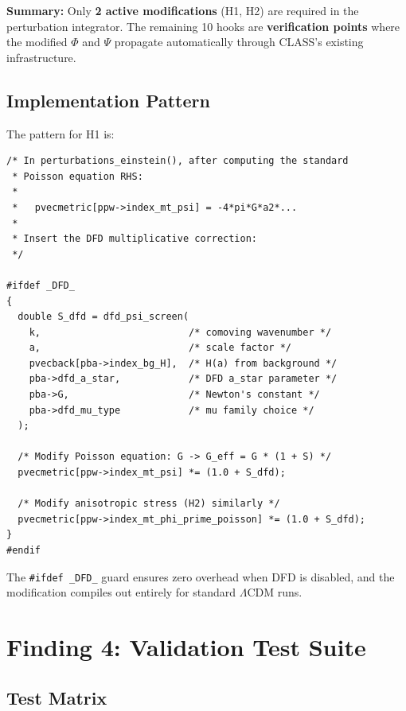\documentclass[11pt]{article}
\theoremstyle{definition}
\theoremstyle{remark}
\newcommand{\LCDM}{$\Lambda$CDM}
\begin{document}
\textbf{Summary:} Only \textbf{2 active modifications} (H1, H2) are
required in the perturbation integrator. The remaining 10 hooks are
\textbf{verification points} where the modified $\Phi$ and $\Psi$
propagate automatically through CLASS's existing infrastructure.

\subsection{Implementation Pattern}

The pattern for H1 is:

\begin{lstlisting}[caption={Hook H1: Poisson equation modification},
  label={lst:hook-h1}]
/* In perturbations_einstein(), after computing the standard
 * Poisson equation RHS:
 *
 *   pvecmetric[ppw->index_mt_psi] = -4*pi*G*a2*...
 *
 * Insert the DFD multiplicative correction:
 */

#ifdef _DFD_
{
  double S_dfd = dfd_psi_screen(
    k,                          /* comoving wavenumber */
    a,                          /* scale factor */
    pvecback[pba->index_bg_H],  /* H(a) from background */
    pba->dfd_a_star,            /* DFD a_star parameter */
    pba->G,                     /* Newton's constant */
    pba->dfd_mu_type            /* mu family choice */
  );

  /* Modify Poisson equation: G -> G_eff = G * (1 + S) */
  pvecmetric[ppw->index_mt_psi] *= (1.0 + S_dfd);

  /* Modify anisotropic stress (H2) similarly */
  pvecmetric[ppw->index_mt_phi_prime_poisson] *= (1.0 + S_dfd);
}
#endif
\end{lstlisting}

The \texttt{\#ifdef \_DFD\_} guard ensures zero overhead when DFD is
disabled, and the modification compiles out entirely for standard
\LCDM{} runs.


\section{Finding 4: Validation Test Suite}
\label{sec:test-suite}

\subsection{Test Matrix}
\end{document}
